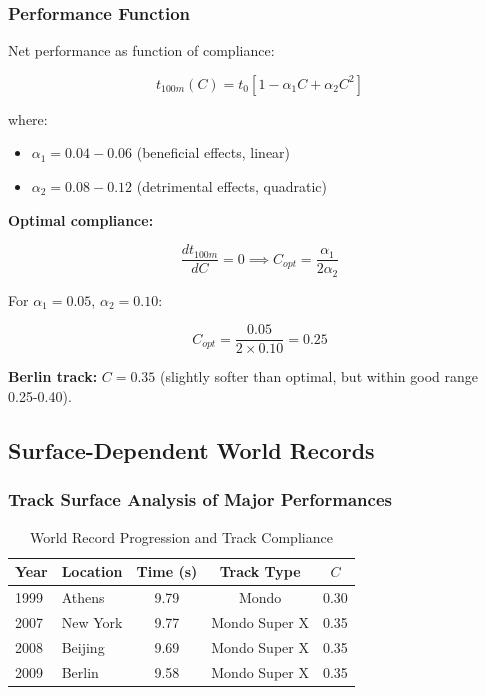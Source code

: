 \subsubsection{Performance Function}

Net performance as function of compliance:

\begin{equation}
t_{100m}(C) = t_0 \left[1 - \alpha_1 C + \alpha_2 C^2\right]
\label{eq:performance_compliance}
\end{equation}

where:
\begin{itemize}
\item $\alpha_1 = 0.04-0.06$ (beneficial effects, linear)
\item $\alpha_2 = 0.08-0.12$ (detrimental effects, quadratic)
\end{itemize}

\textbf{Optimal compliance:}

\begin{equation}
\frac{dt_{100m}}{dC} = 0 \implies C_{opt} = \frac{\alpha_1}{2\alpha_2}
\label{eq:optimal_compliance}
\end{equation}

For $\alpha_1 = 0.05$, $\alpha_2 = 0.10$:

\begin{equation}
C_{opt} = \frac{0.05}{2 \times 0.10} = 0.25
\label{eq:optimal_compliance_value}
\end{equation}

\textbf{Berlin track:} $C = 0.35$ (slightly softer than optimal, but within good range 0.25-0.40).

\subsection{Surface-Dependent World Records}

\subsubsection{Track Surface Analysis of Major Performances}

\begin{table}[H]
\centering
\caption{World Record Progression and Track Compliance}
\begin{tabular}{llccc}
\toprule
Year & Location & Time (s) & Track Type & $C$ \\
\midrule
1999 & Athens & 9.79 & Mondo & 0.30 \\
2007 & New York & 9.77 & Mondo Super X & 0.35 \\
2008 & Beijing & 9.69 & Mondo Super X & 0.35 \\
2009 & Berlin & 9.58 & Mondo Super X & 0.35 \\
\bottomrule
\end{tabular}
\end{table}


